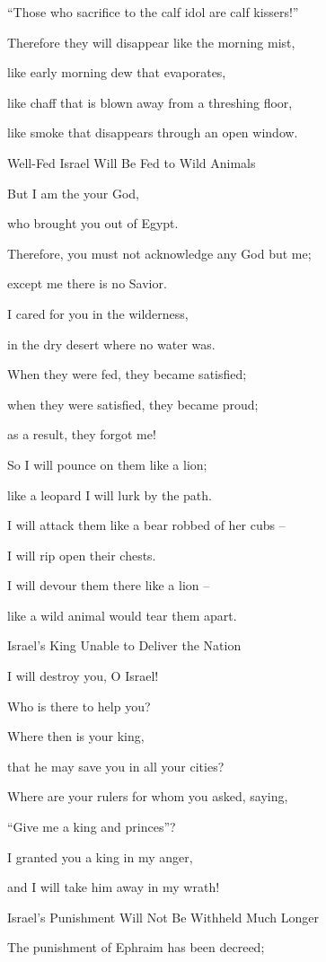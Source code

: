 {\par }{\Q “Those who sacrifice
to the calf
idol are calf kissers!”
\par }{\Q {}Therefore
they will disappear
like the morning mist,
\par }{\Q like early
morning
dew
that evaporates,
\par }{\Q like chaff
that is blown away
from a threshing floor,
\par }{\Q like smoke
that disappears through an open window.
\par }{\SH Well-Fed Israel Will Be Fed to Wild Animals
\par }{\Q {}But I am
the {}
your God,
\par }{\Q who brought you out of Egypt.
\par }{\Q Therefore, you must not
acknowledge
any God
but me;
\par }{\Q except
me there is no
Savior.
\par }{\Q {}I
cared
for you in the wilderness,
\par }{\Q in the dry desert
where no water was.
\par }{\Q {}When they were fed,
they became satisfied;
\par }{\Q when they were satisfied,
they became proud;
\par }{\Q as a result,
they forgot me!
\par }{\Q {}So I will pounce on them like
a lion;
\par }{\Q like a leopard
I will lurk
by the path.
\par }{\Q {}I will attack them
like a bear
robbed
of her cubs
–
\par }{\Q I will rip
open their chests.
\par }{\Q I will devour
them there
like a lion
–
\par }{\Q like a wild
animal
would tear them apart.
\par }{\SH Israel’s King Unable to Deliver the Nation
\par }{\Q {}I will destroy
you, O Israel!
\par }{\Q Who is there to help you?
\par }{\Q {}Where
then is
your king,
\par }{\Q that
he may save
you in all
your cities?
\par }{\Q Where are your rulers
for whom
you asked, saying,
\par }{\Q “Give
me a king
and princes”?
\par }{\Q {}I granted
you a king
in my anger,
\par }{\Q and I will take
him away in my wrath!
\par }{\SH Israel’s Punishment Will Not Be Withheld Much Longer
\par }{\Q {}The punishment
of Ephraim
has been decreed;

}
